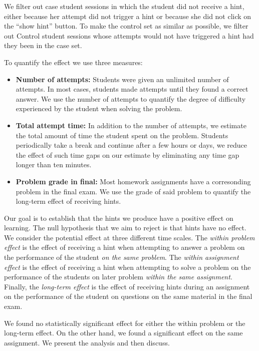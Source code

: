 \documentclass{sigchi/sigchi}
\begin{document}
We filter out case student sessions in which the student did not
receive a hint, either because her attempt did not trigger a hint or
because she did not click on the ``show hint'' button.  To make the
control set as similar as possible, we filter out Control student
sessions whose attempts would not have triggered a hint had they been
in the case set.

To quantify the effect we use three measures:
\begin{itemize}
\item {\bf Number of attempts:} Students were given an unlimited number of attempts. In most cases, students made attempts until they found a correct answer. We use the number of attempts to quantify the degree of difficulty experienced by the student when solving the problem.

\item {\bf Total attempt time:} In addition to the number of attempts, we estimate the total amount of time the student spent on the problem. Students periodically take a break and continue after a few hours or days, we reduce the effect of such time gaps on our estimate by eliminating any time gap longer than ten minutes.
\item {\bf Problem grade in final:} Most homework assignments have a corresonding problem in the final exam. We use the grade of said problem to quantify the long-term effect of receiving hints. 
\end{itemize}

Our goal is to establish that the hints we produce have a positive
effect on learning. The null hypothesis that we aim to reject is that
hints have no effect. We consider the potential effect at three
different time scales. The {\em within problem effect} is the effect
of receiving a hint when attempting to answer a problem on the
performance of the student {\em on the same problem}. The {\em within
  assignment effect} is the effect of receiving a hint when attempting
to solve a problem on the performance of the students on later problem
{\em within the same assignment}. Finally, the {\em long-term effect}
is the effect of receiving hints during an assignment on the
performance of the student on questions on the same material in the
final exam.

We found no statistically significant effect for either the within problem or
the long-term effect. On the other hand, we found a significant effect
on the same assignment. We present the analysis and then discuss.
\end{document}
